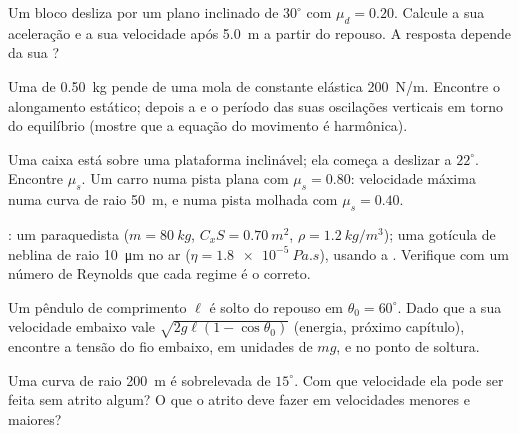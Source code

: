 \begin{exercise}[$\star$]\label{exo:b1:newton-dynamics:3}
Um bloco desliza por um plano inclinado de $30^\circ$ com $\mu_d = 0.20$. Calcule
a sua aceleração e a sua velocidade após \qty{5.0}{m} a partir do repouso. A
resposta depende da sua ?
\end{exercise}

\begin{exercise}[$\star$]\label{exo:b1:newton-dynamics:4}
Uma  de \qty{0.50}{kg} pende de uma mola de constante elástica \qty{200}{N/m}.
Encontre o alongamento estático; depois a  e o período das
suas oscilações verticais em torno do equilíbrio (mostre que a equação do
movimento é harmônica).
\end{exercise}

\begin{exercise}[$\star\star$]\label{exo:b1:newton-dynamics:5}
Uma caixa está sobre uma plataforma inclinável; ela começa a deslizar a $22^\circ$.
Encontre $\mu_s$. Um carro numa pista plana com $\mu_s = 0.80$: velocidade máxima
numa curva de raio \qty{50}{m}, e numa pista molhada com $\mu_s = 0.40$.
\end{exercise}

\begin{exercise}[$\star\star$]\label{exo:b1:newton-dynamics:6}
: um paraquedista ($m = \qty{80}{kg}$, $C_xS = \qty{0.70}{m^2}$,
$\rho = \qty{1.2}{kg/m^3}$); uma gotícula de neblina de raio \qty{10}{\micro m}
no ar ($\eta = \qty{1.8e-5}{Pa.s}$), usando a . Verifique com um
número de Reynolds que cada regime é o correto.
\end{exercise}

\begin{exercise}[$\star\star$]\label{exo:b1:newton-dynamics:7}
Um pêndulo de comprimento $\ell$ é solto do repouso em $\theta_0 = 60^\circ$.
Dado que a sua velocidade embaixo vale $\sqrt{2g\ell(1 - \cos\theta_0)}$
(energia, próximo capítulo), encontre a tensão do fio embaixo, em unidades
de $mg$, e no ponto de soltura.
\end{exercise}

\begin{exercise}[$\star\star$]\label{exo:b1:newton-dynamics:8}
Uma curva de raio \qty{200}{m} é sobrelevada de $15^\circ$. Com que velocidade ela
pode ser feita sem atrito algum? O que o atrito deve fazer em velocidades menores e
maiores?
\end{exercise}

